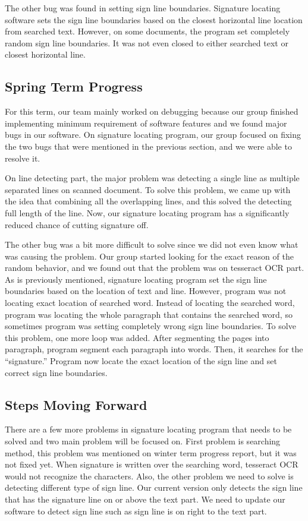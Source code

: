 \documentclass[onecolumn, draftclsnofoot,10pt, compsoc]{IEEEtran}
\begin{document}
The other bug was found in setting sign line boundaries. Signature locating software sets the sign line boundaries based on the closest horizontal line location from searched text. However, on some documents, the program set completely random sign line boundaries. It was not even closed to either searched text or closest horizontal line.


\subsection{Spring Term Progress}
For this term, our team mainly worked on debugging because our group finished implementing minimum requirement of software features and we found major bugs in our software. On signature locating program, our group focused on fixing the two bugs that were mentioned in the previous section, and we were able to resolve it.

On line detecting part, the major problem was detecting a single line as multiple separated lines on scanned document. To solve this problem, we came up with the idea that combining all the overlapping lines, and this solved the detecting full length of the line. Now, our signature locating program has a significantly reduced chance of cutting signature off.

The other bug was a bit more difficult to solve since we did not even know what was causing the problem. Our group started looking for the exact reason of the random behavior, and we found out that the problem was on tesseract OCR part. As is previously mentioned, signature locating program set the sign line boundaries based on the location of text and line. However, program was not locating exact location of searched word. Instead of locating the searched word, program was locating the whole paragraph that contains the searched word, so sometimes program was setting completely wrong sign line boundaries. To solve this problem, one more loop was added. After segmenting the pages into paragraph, program segment each paragraph into words. Then, it searches for the “signature.” Program now locate the exact location of the sign line and set correct sign line boundaries.


\subsection{Steps Moving Forward}
There are a few more problems in signature locating program that needs to be solved and two main problem will be focused on. First problem is searching method, this problem was mentioned on winter term progress report, but it was not fixed yet. When signature is written over the searching word, tesseract OCR would not recognize the characters. Also, the other problem we need to solve is detecting different type of sign line. Our current version only detects the sign line that has the signature line on or above the text part. We need to update our software to detect sign line such as sign line is on right to the text part.
\end{document}
